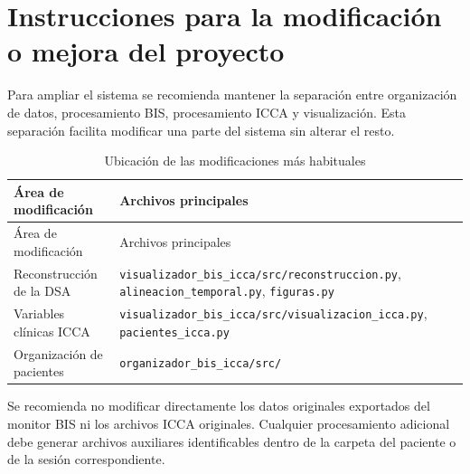 \documentclass[
  spanish,
  a4paper,
  12pt,
  twoside]{memoir}
\begin{document}
\chapter{Instrucciones para la modificación o mejora del
proyecto}\label{instrucciones-para-la-modificaciuxf3n-o-mejora-del-proyecto}

Para ampliar el sistema se recomienda mantener la separación entre
organización de datos, procesamiento BIS, procesamiento ICCA y
visualización. Esta separación facilita modificar una parte del sistema
sin alterar el resto.

\begin{longtable}[]{@{}
  >{\raggedright\arraybackslash}p{}
  >{\raggedright\arraybackslash}p{}@{}}
\caption{Ubicación de las modificaciones más
habituales}\label{tbl-modificaciones-desarrollador}\tabularnewline
\toprule\noalign{}
\begin{minipage}[b]{\linewidth}\raggedright
Área de modificación
\end{minipage} & \begin{minipage}[b]{\linewidth}\raggedright
Archivos principales
\end{minipage} \\
\midrule\noalign{}
\endfirsthead
\toprule\noalign{}
\begin{minipage}[b]{\linewidth}\raggedright
Área de modificación
\end{minipage} & \begin{minipage}[b]{\linewidth}\raggedright
Archivos principales
\end{minipage} \\
\midrule\noalign{}
\endhead
\bottomrule\noalign{}
\endlastfoot
Reconstrucción de la DSA &
\texttt{visualizador\_bis\_icca/src/reconstruccion.py},
\texttt{alineacion\_temporal.py}, \texttt{figuras.py} \\
Variables clínicas ICCA &
\texttt{visualizador\_bis\_icca/src/visualizacion\_icca.py},
\texttt{pacientes\_icca.py} \\
Organización de pacientes & \texttt{organizador\_bis\_icca/src/} \\
\end{longtable}

Se recomienda no modificar directamente los datos originales exportados
del monitor BIS ni los archivos ICCA originales. Cualquier procesamiento
adicional debe generar archivos auxiliares identificables dentro de la
carpeta del paciente o de la sesión correspondiente.
\end{document}

